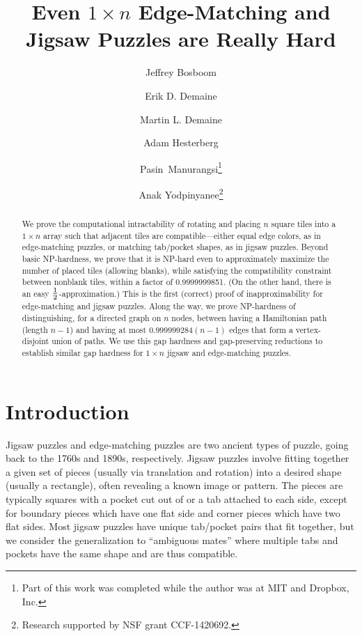 \documentclass[11pt]{article}
\title{Even $1 \times n$ Edge-Matching and Jigsaw Puzzles are Really Hard}
\author[1]{Jeffrey Bosboom}
\author[1]{Erik D. Demaine}
\author[1]{Martin L. Demaine}
\author[1]{Adam Hesterberg}
\author[2]{Pasin~Manurangsi\thanks{Part of this work was completed while the author was at MIT and Dropbox, Inc.}}
\author[1]{Anak Yodpinyanee\thanks{Research supported by NSF grant CCF-1420692.}}
\affil[1]{Massachusetts Institute of Technology,
		  Cambridge, MA 02139, USA \authorcr
          \url{{jbosboom,edemaine,mdemaine,achester,anak}@mit.edu}}
\affil[2]{University of California,
		  Berkeley, CA 94720, USA \authorcr
          \url{pasin@berkeley.edu}}
\date{}
\begin{document}
\maketitle

\begin{abstract}
  We prove the computational intractability of rotating and placing $n$ square
  tiles into a $1 \times n$ array such that adjacent tiles are
  compatible---either equal edge colors, as in edge-matching puzzles,
  or matching tab/pocket shapes, as in jigsaw puzzles.
  Beyond basic NP-hardness, we prove that it is
  NP-hard even to approximately maximize the number of placed tiles (allowing
  blanks), while satisfying the compatibility constraint between nonblank
  tiles, within a factor of 0.9999999851.  (On the other hand, there is
  an easy $1 \over 2$-approximation.)  This is the first (correct) proof of
  inapproximability for edge-matching and jigsaw puzzles.
  Along the way, we prove NP-hardness of distinguishing, for a directed graph
  on $n$ nodes, between having a Hamiltonian path (length $n-1$) and having
  at most $0.999999284(n-1)$ edges that form a vertex-disjoint union of paths.
  We use this gap hardness and gap-preserving reductions to establish similar
  gap hardness for $1 \times n$ jigsaw and edge-matching puzzles.
\end{abstract}

\section{Introduction}

Jigsaw puzzles \cite{Williams-2004} and edge-matching puzzles
\cite{Haubrich-1995} are two ancient types of puzzle, going back to the
1760s and 1890s, respectively.  Jigsaw puzzles involve fitting together a given
set of pieces (usually via translation and rotation) into a desired shape
(usually a rectangle), often revealing a known image or pattern.
The pieces are typically squares with a pocket cut out of or a tab attached
to each side, except for boundary pieces which have one flat side
and corner pieces which have two flat sides.
Most jigsaw puzzles have unique tab/pocket pairs that fit together, but we
consider the generalization to ``ambiguous mates'' where multiple tabs and
pockets have the same shape and are thus compatible.
\end{document}
